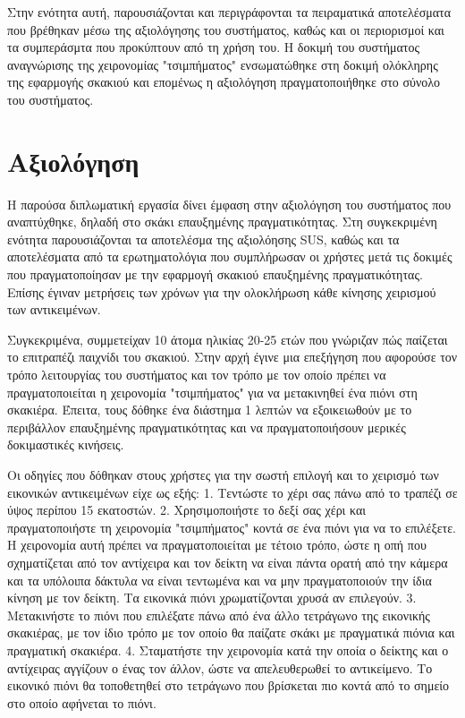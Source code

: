 


Στην ενότητα αυτή, παρουσιάζονται και περιγράφονται τα πειραματικά αποτελέσματα που βρέθηκαν μέσω της αξιολόγησης του συστήματος, καθώς και οι περιορισμοί και τα συμπεράσμτα που προκύπτουν από τη χρήση του. Η δοκιμή του συστήματος αναγνώρισης της χειρονομίας "τσιμπήματος" ενσωματώθηκε στη δοκιμή ολόκληρης της εφαρμογής σκακιού και επομένως η αξιολόγηση πραγματοποιήθηκε στο σύνολο του συστήματος.





\section{Αξιολόγηση}



Η παρούσα διπλωματική εργασία δίνει έμφαση στην αξιολόγηση του συστήματος που αναπτύχθηκε, δηλαδή στο σκάκι επαυξημένης πραγματικότητας.
Στη συγκεκριμένη ενότητα παρουσιάζονται τα αποτελέσμα της αξιολόησης SUS, καθώς και τα αποτελέσματα από τα ερωτηματολόγια που συμπλήρωσαν οι χρήστες μετά τις δοκιμές που πραγματοποίησαν με την εφαρμογή σκακιού επαυξημένης πραγματικότητας. Επίσης έγιναν μετρήσεις των χρόνων για την ολοκλήρωση κάθε κίνησης χειρισμού των αντικειμένων.


Συγκεκριμένα, συμμετείχαν 10 άτομα ηλικίας 20-25 ετών που γνώριζαν πώς παίζεται το επιτραπέζι παιχνίδι του σκακιού. Στην αρχή έγινε μια επεξήγηση που αφορούσε τον τρόπο λειτουργίας του συστήματος και τον τρόπο με τον οποίο πρέπει να πραγματοποιείται η χειρονομία "τσιμπήματος" για να μετακινηθεί ένα πιόνι στη σκακιέρα. Έπειτα, τους δόθηκε ένα διάστημα 1 λεπτών να εξοικειωθούν με το περιβάλλον επαυξημένης πραγματικότητας και να πραγματοποιήσουν μερικές δοκιμαστικές κινήσεις.

Οι οδηγίες που δόθηκαν στους χρήστες για την σωστή επιλογή και το χειρισμό των εικονικών αντικειμένων είχε ως εξής:
1. Τεντώστε το χέρι σας πάνω από το τραπέζι σε ύψος περίπου 15 εκατοστών.
2. Χρησιμοποιήστε το δεξί σας χέρι και πραγματοποιήστε τη χειρονομία "τσιμπήματος" κοντά σε ένα πιόνι για να το επιλέξετε. Η χειρονομία αυτή πρέπει να πραγματοποιείται με τέτοιο τρόπο, ώστε η οπή που σχηματίζεται από τον αντίχειρα και τον δείκτη να είναι πάντα ορατή από την κάμερα και τα υπόλοιπα δάκτυλα να είναι τεντωμένα και να μην πραγματοποιούν την ίδια κίνηση με τον δείκτη. Τα εικονικά πιόνι χρωματίζονται χρυσά αν επιλεγούν.
3. Μετακινήστε το πιόνι που επιλέξατε πάνω από ένα άλλο τετράγωνο της εικονικής σκακιέρας, με τον ίδιο τρόπο με τον οποίο θα παίζατε σκάκι με πραγματικά πιόνια και πραγματική σκακιέρα. 
4. Σταματήστε την χειρονομία κατά την οποία ο δείκτης και ο αντίχειρας αγγίζουν ο ένας τον άλλον, ώστε να απελευθερωθεί το αντικείμενο. Το εικονικό πιόνι θα τοποθετηθεί στο τετράγωνο που βρίσκεται πιο κοντά από το σημείο στο οποίο αφήνεται το πιόνι.


